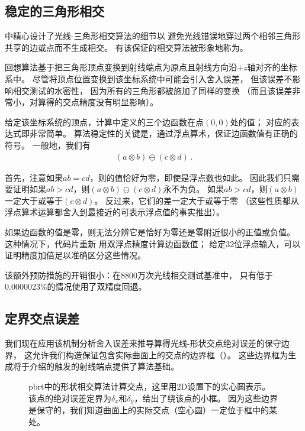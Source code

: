 \subsection{稳定的三角形相交}\label{sub:稳定的三角形相交}
中精心设计了光线-三角形相交算法的细节以
避免光线错误地穿过两个相邻三角形共享的边或点而不生成相交。
有该保证的相交算法被形象地称为。

回想算法基于把三角形顶点变换到射线端点为原点且射线方向沿$+z$轴对齐的坐标系中。
尽管将顶点位置变换到该坐标系统中可能会引入舍入误差，
但该误差不影响相交测试的水密性，
因为所有的三角形都被施加了同样的变换
（而且该误差非常小，对算得的交点精度没有明显影响）。

给定该坐标系统的顶点，计算中定义的三个边函数在点$(0,0)$处的值；
对应的表达式即非常简单。
算法稳定性的关键是，通过浮点算术，保证边函数值有正确的符号。
一般地，我们有
\begin{align}\label{eq:3.12}
    (a\otimes b)\ominus(c\otimes d)\, .
\end{align}

首先，注意如果$ab=cd$，则的值恰好为零，即使是浮点数也如此。
因此我们只需要证明如果$ab>cd$，则$(a\otimes b)\ominus(c\otimes d)$永不为负。
如果$ab>cd$，则$(a\otimes b)$一定大于或等于$(c\otimes d)$。
反过来，它们的差一定大于或等于零
（这些性质都从浮点算术运算都舍入到最接近的可表示浮点值的事实推出）。

如果边函数的值是零，则无法分辨它是恰好为零还是零附近很小的正值或负值。
这种情况下，代码片重新
用双浮点精度计算边函数值；
给定32位浮点输入，可以证明精度加倍足以准确区分这些情况。

该额外预防措施的开销很小：在8800万次光线相交测试基准中，
只有低于0.0000023\%的情况使用了双精度回退。

\subsection{定界交点误差}\label{sub:定界交点误差}
我们现在应用该机制分析舍入误差来推导算得光线-形状交点绝对误差的保守边界，
这允许我们构造保证包含实际曲面上的交点的边界框（）。
这些边界框为生成将于介绍的触发的射线端点提供了算法基础。
\begin{figure}[htbp]
    \centering
    \caption{pbrt中的形状相交算法计算交点，这里用2D设置下的实心圆表示。
        该点的绝对误差定界为$\delta_x$和$\delta_y$，给出了绕该点的小框。
        因为这些边界是保守的，我们知道曲面上的实际交点（空心圆）一定位于框中的某处。}
    \label{fig:3.43}
\end{figure}

